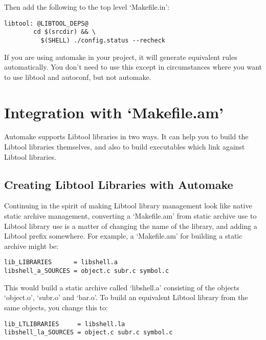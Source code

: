 \begin{description}
 Then add the following to the top level `Makefile.in': 



 

\begin{Verbatim}[frame=single]
libtool: @LIBTOOL_DEPS@
        cd $(srcdir) && \
          $(SHELL) ./config.status --recheck
\end{Verbatim}



 If you are using automake in your project, it will generate equivalent rules automatically. You don't need to use this except in circumstances where you want to use libtool and autoconf, but not automake.
\end{description}

\section{Integration with `Makefile.am'}


Automake supports Libtool libraries in two ways. It can help you to build the Libtool libraries themselves, and also to build executables which link against Libtool libraries. 

\subsection{Creating Libtool Libraries with Automake}\label{SS_Creating_Libtool_Libraries_with_Automake}


Continuing in the spirit of making Libtool library management look like native static archive management, converting a `Makefile.am' from static archive use to Libtool library use is a matter of changing the name of the library, and adding a Libtool prefix somewhere. For example, a `Makefile.am' for building a static archive might be: 

\begin{Verbatim}[frame=single]
lib_LIBRARIES      = libshell.a
libshell_a_SOURCES = object.c subr.c symbol.c
\end{Verbatim}



 This would build a static archive called `libshell.a' consisting of the objects `object.o', `subr.o' and `bar.o'. To build an equivalent Libtool library from the same objects, you change this to: 



\begin{Verbatim}[frame=single]
lib_LTLIBRARIES     = libshell.la
libshell_la_SOURCES = object.c subr.c symbol.c
\end{Verbatim}

